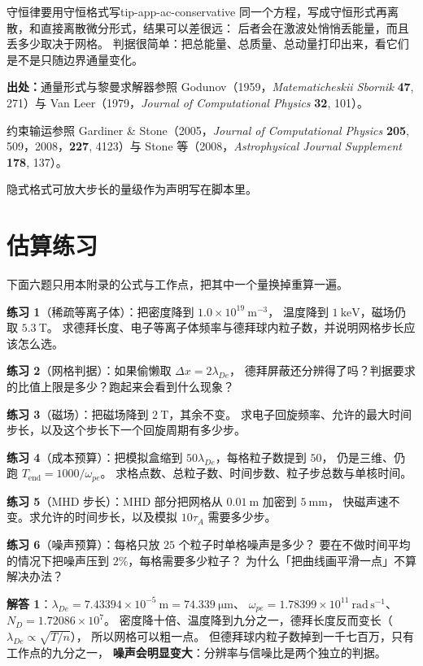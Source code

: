 \begin{tip}{守恒律要用守恒格式写}{tip-app-ac-conservative}
同一个方程，写成守恒形式再离散，和直接离散微分形式，结果可以差很远：
后者会在激波处悄悄丢能量，而且丢多少取决于网格。
判据很简单：把总能量、总质量、总动量打印出来，看它们是不是只随边界通量变化。
\end{tip}

{\footnotesize
\textbf{出处：}通量形式与黎曼求解器参照 Godunov（1959，\emph{Matematicheskii Sbornik}
\textbf{47}, 271）与 Van Leer（1979，\emph{Journal of Computational Physics} \textbf{32}, 101）。

约束输运参照 Gardiner \& Stone（2005，\emph{Journal of Computational Physics} \textbf{205}, 509，2008，\textbf{227}, 4123）与 Stone 等（2008，\emph{Astrophysical Journal Supplement}
\textbf{178}, 137）。

隐式格式可放大步长的量级作为声明写在脚本里。
\section{估算练习}
\label{sec:app-ac-problems}
}

下面六题只用本附录的公式与工作点，把其中一个量换掉重算一遍。

\textbf{练习 1}（稀疏等离子体）：把密度降到 $1.0\times10^{19}\ \mathrm{m^{-3}}$，
温度降到 $1\ \mathrm{keV}$，磁场仍取 $5.3\ \mathrm{T}$。
求德拜长度、电子等离子体频率与德拜球内粒子数，并说明网格步长应该怎么选。

\textbf{练习 2}（网格判据）：如果偷懒取 $\Delta x=2\lambda_{De}$，
德拜屏蔽还分辨得了吗？判据要求的比值上限是多少？跑起来会看到什么现象？

\textbf{练习 3}（磁场）：把磁场降到 $2\ \mathrm{T}$，其余不变。
求电子回旋频率、允许的最大时间步长，以及这个步长下一个回旋周期有多少步。

\textbf{练习 4}（成本预算）：把模拟盒缩到 $50\lambda_{De}$，每格粒子数提到 $50$，
仍是三维、仍跑 $T_{\mathrm{end}}=1000/\omega_{pe}$。
求格点数、总粒子数、时间步数、粒子步总数与单核时间。

\textbf{练习 5}（MHD 步长）：MHD 部分把网格从 $0.01\ \mathrm{m}$ 加密到 $5\ \mathrm{mm}$，
快磁声速不变。求允许的时间步长，以及模拟 $10\tau_A$ 需要多少步。

\textbf{练习 6}（噪声预算）：每格只放 $25$ 个粒子时单格噪声是多少？
要在不做时间平均的情况下把噪声压到 $2\%$，每格需要多少粒子？
为什么「把曲线画平滑一点」不算解决办法？

\textbf{解答 1}：$\lambda_{De}=7.43394\times10^{-5}\ \mathrm{m}=74.339\ \mathrm{\mu m}$、
$\omega_{pe}=1.78399\times10^{11}\ \mathrm{rad\,s^{-1}}$、
$N_D=1.72086\times10^{7}$。
密度降十倍、温度降到九分之一，德拜长度反而变长（$\lambda_{De}\propto\sqrt{T/n}$），
所以网格可以粗一点。
但德拜球内粒子数掉到一千七百万，只有工作点的九分之一，
\textbf{噪声会明显变大}：分辨率与信噪比是两个独立的判据。

